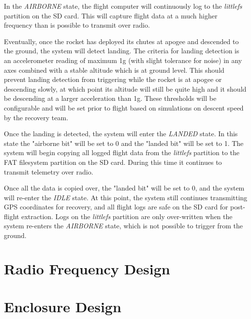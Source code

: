 In the \textit{AIRBORNE} state, the flight computer will continuously log to the \textit{littlefs} partition on the SD card. This will capture flight data at a much higher frequency than is possible to transmit over radio.

Eventually, once the rocket has deployed its chutes at apogee and descended to the ground, the system will detect landing. The criteria for landing detection is an accelerometer reading of maximum 1g (with slight tolerance for noise) in any axes combined with a stable altitude which is at ground level. This should prevent landing detection from triggering while the rocket is at apogee or descending slowly, at which point its altitude will still be quite high and it should be descending at a larger acceleration than 1g. These thresholds will be configurable and will be set prior to flight based on simulations on descent speed by the recovery team.

Once the landing is detected, the system will enter the \textit{LANDED} state. In this state the "airborne bit" will be set to 0 and the "landed bit" will be set to 1. The system will begin copying all logged flight data from the \textit{littlefs} partition to the FAT filesystem partition on the SD card. During this time it continues to transmit telemetry over radio.

Once all the data is copied over, the "landed bit" will be set to 0, and the system will re-enter the \textit{IDLE} state. At this point, the system still continues transmitting GPS coordinates for recovery, and all flight logs are safe on the SD card for post-flight extraction. Logs on the \textit{littlefs} partition are only over-written when the system re-enters the \textit{AIRBORNE} state, which is not possible to trigger from the ground.


\section{Radio Frequency Design}


\section{Enclosure Design}
